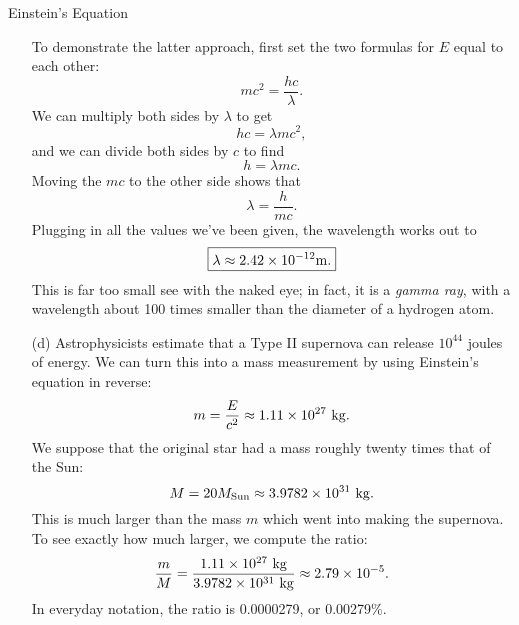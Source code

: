 \documentclass[12pt]{article}
\begin{document}
\begin{probdesc}{7}{Einstein's Equation}
\begin{enumerate}
  To demonstrate the latter approach, first set the two formulas for
  $E$ equal to each other:
  \begin{equation}
    mc^2 = \frac{hc}{\lambda}.
  \end{equation}
  We can multiply both sides by $\lambda$ to get
  \begin{equation}
    hc = \lambda m c^2,
  \end{equation}
  and we can divide both sides by $c$ to find
  \begin{equation}
    h = \lambda m c.
  \end{equation}
  Moving the $mc$ to the other side shows that
  \begin{equation}
    \lambda = \frac{h}{mc}.
  \end{equation}
  Plugging in all the values we've been given, the wavelength works
  out to
  \begin{equation}
    \boxed{\lambda \approx 2.42 \times 10^{-12} {\rm m}.}
  \end{equation}
  This is far too small see with the naked eye; in fact, it is a {\em
  gamma ray}, with a wavelength about 100 times smaller than the
  diameter of a hydrogen atom.


\item[(d)] Astrophysicists estimate that a Type II supernova can
  release $10^{44}$ joules of energy.  We can turn this into a mass
  measurement by using Einstein's equation in reverse:
  \begin{equation}
    m = \frac{E}{c^2} \approx 1.11\times10^{27} {\rm\ kg.}
  \end{equation}
  We suppose that the original star had a mass roughly twenty times
  that of the Sun:
  \begin{equation}
    M = 20 M_{\rm Sun} \approx 3.9782\times10^{31} {\rm\ kg.}
  \end{equation}
  This is much larger than the mass $m$ which went into making the
  supernova.  To see exactly how much larger, we compute the ratio:
  \begin{equation}
    \frac{m}{M} = 
    \frac{1.11\times10^{27} \rm\ kg}{3.9782\times10^{31} \rm\ kg}
    \approx 2.79\times10^{-5}.
  \end{equation}
  In everyday notation, the ratio is 0.0000279, or 0.00279\%.
\end{enumerate}
\end{probdesc}
\end{document}
